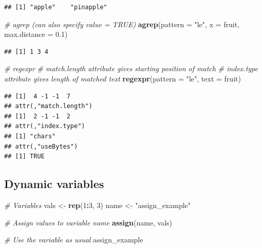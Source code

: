 \documentclass[
]{book}
\newenvironment{Shaded}{\begin{snugshade}}{\end{snugshade}}
\newcommand{\CommentTok}[1]{\textcolor[rgb]{0.56,0.35,0.01}{\textit{#1}}}
\newcommand{\DataTypeTok}[1]{\textcolor[rgb]{0.13,0.29,0.53}{#1}}
\newcommand{\DecValTok}[1]{\textcolor[rgb]{0.00,0.00,0.81}{#1}}
\newcommand{\FloatTok}[1]{\textcolor[rgb]{0.00,0.00,0.81}{#1}}
\newcommand{\KeywordTok}[1]{\textcolor[rgb]{0.13,0.29,0.53}{\textbf{#1}}}
\newcommand{\NormalTok}[1]{#1}
\newcommand{\OperatorTok}[1]{\textcolor[rgb]{0.81,0.36,0.00}{\textbf{#1}}}
\newcommand{\StringTok}[1]{\textcolor[rgb]{0.31,0.60,0.02}{#1}}
\begin{document}
\begin{verbatim}
## [1] "apple"    "pinapple"
\end{verbatim}

\begin{Shaded}
\begin{Highlighting}[]
\CommentTok{# agrep (can also specify value = TRUE)}
\KeywordTok{agrep}\NormalTok{(}\DataTypeTok{pattern =} \StringTok{"le"}\NormalTok{, }\DataTypeTok{x =}\NormalTok{ fruit, }\DataTypeTok{max.distance =} \FloatTok{0.1}\NormalTok{)}
\end{Highlighting}
\end{Shaded}

\begin{verbatim}
## [1] 1 3 4
\end{verbatim}

\begin{Shaded}
\begin{Highlighting}[]
\CommentTok{# regexpr}
\CommentTok{# match.length attribute gives starting position of match}
\CommentTok{# index.type attribute gives length of matched text}
\KeywordTok{regexpr}\NormalTok{(}\DataTypeTok{pattern =} \StringTok{"le"}\NormalTok{, }\DataTypeTok{text =}\NormalTok{ fruit)}
\end{Highlighting}
\end{Shaded}

\begin{verbatim}
## [1]  4 -1 -1  7
## attr(,"match.length")
## [1]  2 -1 -1  2
## attr(,"index.type")
## [1] "chars"
## attr(,"useBytes")
## [1] TRUE
\end{verbatim}

\hypertarget{dynamic-variables}{%
\subsection{Dynamic variables}\label{dynamic-variables}}

\begin{Shaded}
\begin{Highlighting}[]
\CommentTok{# Variables}
\NormalTok{vals <-}\StringTok{ }\KeywordTok{rep}\NormalTok{(}\DecValTok{1}\OperatorTok{:}\DecValTok{3}\NormalTok{, }\DecValTok{3}\NormalTok{)}
\NormalTok{name <-}\StringTok{ "assign_example"}

\CommentTok{# Assign values to variable name}
\KeywordTok{assign}\NormalTok{(name, vals)}

\CommentTok{# Use the variable as usual}
\NormalTok{assign_example}
\end{Highlighting}
\end{Shaded}
\end{document}
